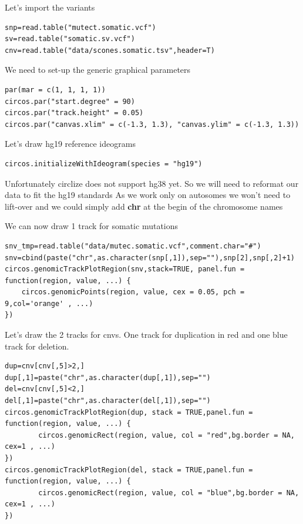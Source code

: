 Let's import the variants

\begin{steps}
\begin{lstlisting}
snp=read.table("mutect.somatic.vcf")
sv=read.table("somatic.sv.vcf")
cnv=read.table("data/scones.somatic.tsv",header=T)
\end{lstlisting}
\end{steps}


We need to set-up the generic graphical parameters

\begin{steps}
\begin{lstlisting}
par(mar = c(1, 1, 1, 1))
circos.par("start.degree" = 90)
circos.par("track.height" = 0.05)
circos.par("canvas.xlim" = c(-1.3, 1.3), "canvas.ylim" = c(-1.3, 1.3))
\end{lstlisting}
\end{steps}

Let's draw hg19 reference ideograms

\begin{steps}
\begin{lstlisting}
circos.initializeWithIdeogram(species = "hg19")
\end{lstlisting}
\end{steps}

Unfortunately circlize does not support hg38 yet. So we will need to reformat our data to fit the hg19 standards
As we work only on autosomes we won't need to lift-over and we could simply add \textbf{chr} at the begin of the chromosome names

We can now draw 1 track for somatic mutations

\begin{steps}
\begin{lstlisting}snv_tmp=read.table("data/mutec.somatic.vcf",comment.char="#")
snv=cbind(paste("chr",as.character(snp[,1]),sep=""),snp[2],snp[,2]+1)
circos.genomicTrackPlotRegion(snv,stack=TRUE, panel.fun = function(region, value, ...) {
    circos.genomicPoints(region, value, cex = 0.05, pch = 9,col='orange' , ...)
})
\end{lstlisting}
\end{steps}


Let's draw the 2 tracks for cnvs. One track for duplication in red and one blue track for deletion.

\begin{steps}
\begin{lstlisting}
dup=cnv[cnv[,5]>2,]
dup[,1]=paste("chr",as.character(dup[,1]),sep="")
del=cnv[cnv[,5]<2,]
del[,1]=paste("chr",as.character(del[,1]),sep="")
circos.genomicTrackPlotRegion(dup, stack = TRUE,panel.fun = function(region, value, ...) {
        circos.genomicRect(region, value, col = "red",bg.border = NA, cex=1 , ...)
})
circos.genomicTrackPlotRegion(del, stack = TRUE,panel.fun = function(region, value, ...) {
        circos.genomicRect(region, value, col = "blue",bg.border = NA, cex=1 , ...)
})
\end{lstlisting}
\end{steps}


